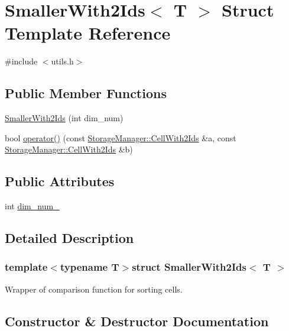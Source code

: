 \hypertarget{structSmallerWith2Ids}{}\section{Smaller\+With2\+Ids$<$ T $>$ Struct Template Reference}
\label{structSmallerWith2Ids}


{\ttfamily \#include $<$utils.\+h$>$}

\subsection*{Public Member Functions}
\begin{DoxyCompactItemize}
\item 
\hyperlink{structSmallerWith2Ids_ab5de469d2c382147630d88be6f2b7af4}{Smaller\+With2\+Ids} (int dim\+\_\+num)
\item 
bool \hyperlink{structSmallerWith2Ids_abb87a4909b6c4c3f6837fc328a8de355}{operator()} (const \hyperlink{structStorageManager_1_1CellWith2Ids}{Storage\+Manager\+::\+Cell\+With2\+Ids} \&a, const \hyperlink{structStorageManager_1_1CellWith2Ids}{Storage\+Manager\+::\+Cell\+With2\+Ids} \&b)
\end{DoxyCompactItemize}
\subsection*{Public Attributes}
\begin{DoxyCompactItemize}
\item 
int \hyperlink{structSmallerWith2Ids_a90e90ddde7af12b14e3e8e163e52cfc2}{dim\+\_\+num\+\_\+}
\end{DoxyCompactItemize}


\subsection{Detailed Description}
\subsubsection*{template$<$typename T$>$struct Smaller\+With2\+Ids$<$ T $>$}

Wrapper of comparison function for sorting cells. 

\subsection{Constructor \& Destructor Documentation}
\hypertarget{structSmallerWith2Ids_ab5de469d2c382147630d88be6f2b7af4}{}
